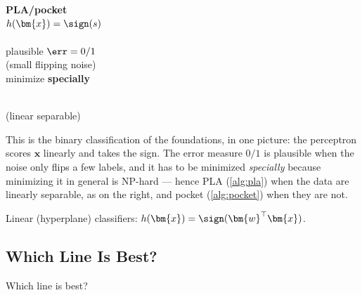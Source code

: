 \begin{center}
    \begin{minipage}[c]{0.5\textwidth}
        \centering
        \textbf{PLA/pocket}\\[4pt]
        \(h(\bm{x}) = \sign(s)\)\\[4pt]
        \\[4pt]
        plausible \(\err = 0/1\)\\
        {\small (small flipping noise)}\\
        minimize \textbf{specially}
    \end{minipage}%
    \hfill
    \begin{minipage}[c]{0.42\textwidth}
        \centering
        \\[2pt]
        {\small (linear separable)}
    \end{minipage}
\end{center}

This is the binary classification of the foundations, in one picture: the
perceptron scores \(\bm{x}\) linearly and takes the sign. The error measure
\(0/1\) is plausible when the noise only flips a few labels, and it has to be
minimized \emph{specially} because minimizing it in general is NP-hard ---
hence PLA (\autoref{alg:pla}) when the data are linearly separable, as on the
right, and pocket (\autoref{alg:pocket}) when they are not.

\begin{moral}
    Linear (hyperplane) classifiers: \(h(\bm{x}) = \sign(\bm{w}^\top
    \bm{x})\).
\end{moral}

\subsection{Which Line Is Best?}

\begin{question}
    Which line is best?
\end{question}

